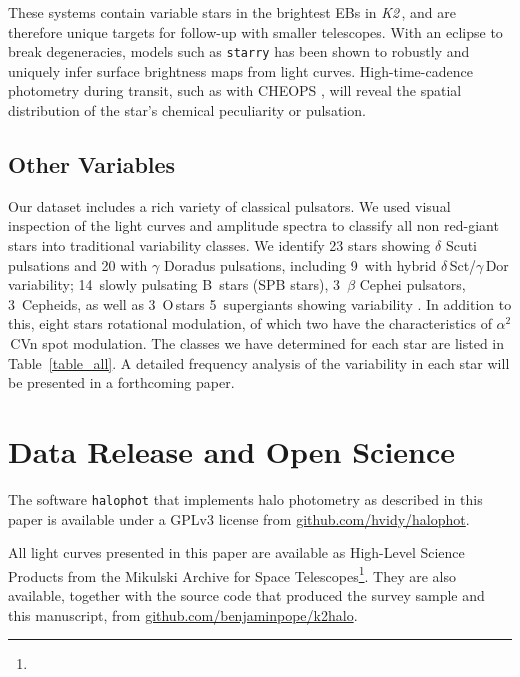 \documentclass[modern]{aastex62}
\newcommand\ktwo{\emph{K2}\,}
\begin{document}
These systems contain variable stars in the brightest EBs in \ktwo, and are therefore unique targets for follow-up with smaller telescopes. With an eclipse to break degeneracies, models such as \texttt{starry} \citep{starry} has been shown to robustly and uniquely infer surface brightness maps from light curves. High-time-cadence photometry during transit, such as with CHEOPS \citep{cheops}, will reveal the spatial distribution of the star's chemical peculiarity or pulsation. 

\subsection{Other Variables}
\label{sec:variables}

Our dataset includes a rich variety of classical pulsators. We used visual inspection of the light curves and amplitude spectra to classify all non red-giant stars into traditional variability classes. We identify 23 stars showing $\delta$ Scuti pulsations and 20 with $\gamma$ Doradus pulsations, including 9~with hybrid $\delta$\,Sct/$\gamma$\,Dor variability; 14~slowly pulsating B~stars (SPB stars), 3~$\beta$ Cephei pulsators, 3~Cepheids, as well as 3~O\,stars 5~supergiants showing variability \citep[as in][]{Aerts2018,bowman19}. In addition to this, eight stars rotational modulation, of which two have the characteristics of $\alpha^2$\,CVn spot modulation. The classes we have determined for each star are listed in Table~\ref{table_all}. A detailed frequency analysis of the variability in each star will be presented in a forthcoming paper.


\section{Data Release and Open Science}

The software \texttt{halophot} that implements halo photometry as described in this paper is available under a GPLv3 license from \href{https://github.com/hvidy/halophot}{github.com/hvidy/halophot}. 

All light curves presented in this paper are available as High-Level Science Products from the Mikulski Archive for Space Telescopes\footnote{}.  They are also available, together with the source code that produced the survey sample and this manuscript, from \href{https://github.com/benjaminpope/k2halo}{github.com/benjaminpope/k2halo}.
\end{document}
